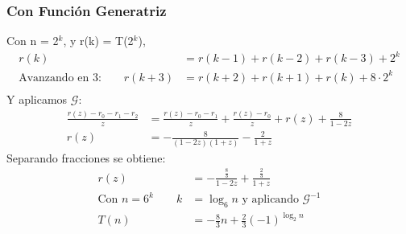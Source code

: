 		\subsubsection{Con Función Generatriz}
			Con n = 2$^k$, y r(k) = T(2$^k$),
		\begin{eqnarray*}
			r(k) &= r(k-1) + r(k-2) + r(k-3) + 2^k\\
			\text{Avanzando en 3:} \qquad r(k+3) &= r(k+2) + r(k+1) + r(k) + 8 \cdot 2^k\\
		\end{eqnarray*}
		Y aplicamos $\mathcal{G}$:
		\begin{eqnarray*}
			\frac{r(z) - r_0 - r_1 - r_2}{z} &= \frac{r(z) - r_0 - r_1}{z} + \frac{r(z) - r_0}{z} + r(z) + \frac{8}{1 - 2z}\\
			r(z) &= -\frac{8}{(1-2z)(1+z)} - \frac{2}{1+z}
		\end{eqnarray*}
		Separando fracciones se obtiene:
		\begin{eqnarray*}
			r(z) &= - \frac{\frac{8}{3}}{1-2z} + \frac{\frac{2}{3}}{1+z}\\
			\text{Con } n = 6^{k} \qquad k &= \log_6 n \text{ y aplicando } \mathcal{G}^{-1}\\
			T(n) &= -\frac{8}{3} n  + \frac{2}{3} (-1)^{\log_2 n}
		\end{eqnarray*}
	
